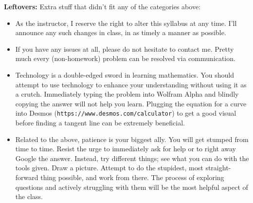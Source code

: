 \documentclass[12pt]{amsbook}
\begin{document}
\textbf{Leftovers:} Extra stuff that didn't fit any of the categories above:
\begin{itemize}
\item As the instructor, I reserve the right to alter this syllabus at any time. I'll announce any such changes in class, in as timely a manner as possible. 
\item If you have any issues at all, please do not hesitate to contact me. Pretty much every (non-homework) problem can be resolved via communication.
\item Technology is a double-edged sword in learning mathematics. You should attempt to use technology to enhance your understanding without using it as a crutch. Immediately typing the problem into Wolfram Alpha and blindly copying the answer will not help you learn. Plugging the equation for a curve into Desmos (\texttt{https://www.desmos.com/calculator}) to get a good visual before finding a tangent line can be extremely beneficial.
\item Related to the above, patience is your biggest ally. You will get stumped from time to time. Resist the urge to immediately ask for help or to right away Google the answer. Instead, try different things; see what you can do with the tools given. Draw a picture. Attempt to do the stupidest, most straight-forward thing possible, and work from there. The process of exploring questions and actively struggling with them will be the most helpful aspect of the class.
\end{itemize}
\end{document}
